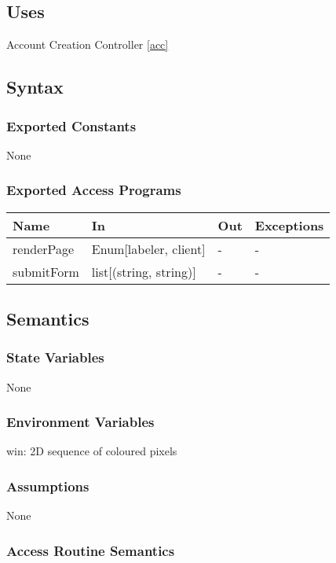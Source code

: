 \documentclass[12pt, titlepage]{article}
\begin{document}
\subsection{Uses}

Account Creation Controller \ref{acc}

\subsection{Syntax}

\subsubsection{Exported Constants}
None
\subsubsection{Exported Access Programs}

\begin{center}
\begin{tabular}{p{2cm} p{4cm} p{4cm} p{2cm}}
\hline
\textbf{Name} & \textbf{In} & \textbf{Out} & \textbf{Exceptions} \\
\hline
renderPage & Enum[labeler, client] & - & - \\
submitForm & list[(string, string)] & - & - \\
\hline
\end{tabular}
\end{center}

\subsection{Semantics}

\subsubsection{State Variables}
None
\subsubsection{Environment Variables}
win: 2D sequence of coloured pixels

\subsubsection{Assumptions}
None

\subsubsection{Access Routine Semantics}
\end{document}
